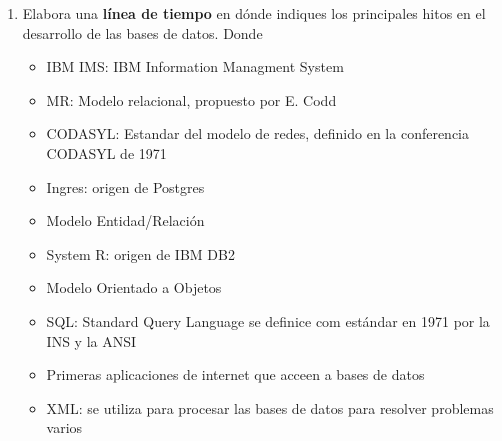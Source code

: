 \documentclass[10pt]{article}
\begin{document}
\begin{enumerate}[label=\alph*.]
        \item {
            Elabora una \textbf{línea de tiempo} en dónde indiques los principales
            hitos en el desarrollo de las bases de datos.
            \startchronology[startyear=1959, stopyear=1980]
            \stopchronology
            }
            \startchronology[startyear=1981, stopyear=2000]
            \stopchronology
            Donde 
            \begin{itemize}
                \item {IBM IMS: IBM Information Managment System}
                \item {MR: Modelo relacional, propuesto por E. Codd}
                \item {CODASYL: Estandar del modelo de redes, definido en la 
                conferencia CODASYL de 1971}
                \item {Ingres: origen de Postgres}
                \item {Modelo Entidad/Relación}
                \item {System R: origen de IBM DB2}
                \item {Modelo Orientado a Objetos}
                \item {SQL: Standard Query Language se definice com estándar en 
                1971 por la INS y la ANSI}
                \item {Primeras aplicaciones de internet que acceen a bases de
                datos}
                \item {XML: se utiliza para procesar las bases de datos para 
                resolver problemas varios}\\
            \end{itemize}
        

\end{enumerate}
\end{document}

